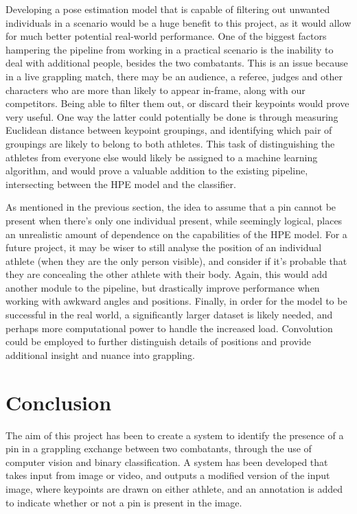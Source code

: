 \documentclass[a4paper, oneside, 11pt]{article}
\begin{document}
\bigskip
\noindent
Developing a pose estimation model that is capable of filtering out unwanted individuals in a scenario would be a huge benefit to this project, as it would allow for much better potential real-world performance. One of the biggest factors hampering the pipeline from working in a practical scenario is the inability to deal with additional people, besides the two combatants. This is an issue because in a live grappling match, there may be an audience, a referee, judges and other characters who are more than likely to appear in-frame, along with our competitors. Being able to filter them out, or discard their keypoints would prove very useful. One way the latter could potentially be done is through measuring Euclidean distance between keypoint groupings, and identifying which pair of groupings are likely to belong to both athletes. This task of distinguishing the athletes from everyone else would likely be assigned to a machine learning algorithm, and would prove a valuable addition to the existing pipeline, intersecting between the HPE model and the classifier. 

\bigskip
\noindent
As mentioned in the previous section, the idea to assume that a pin cannot be present when there's only one individual present, while seemingly logical, places an unrealistic amount of dependence on the capabilities of the HPE model. For a future project, it may be wiser to still analyse the position of an individual athlete (when they are the only person visible), and consider if it's probable that they are concealing the other athlete with their body. Again, this would add another module to the pipeline, but drastically improve performance when working with awkward angles and positions. Finally, in order for the model to be successful in the real world, a significantly larger dataset is likely needed, and perhaps more computational power to handle the increased load. Convolution could be employed to further distinguish details of positions and provide additional insight and nuance into grappling.

\bigskip
\noindent

\section{Conclusion}

The aim of this project has been to create a system to identify the presence of a pin in a grappling exchange between two combatants, through the use of computer vision and binary classification. A system has been developed that takes input from image or video, and outputs a modified version of the input image, where keypoints are drawn on either athlete, and an annotation is added to indicate whether or not a pin is present in the image.
\end{document}
